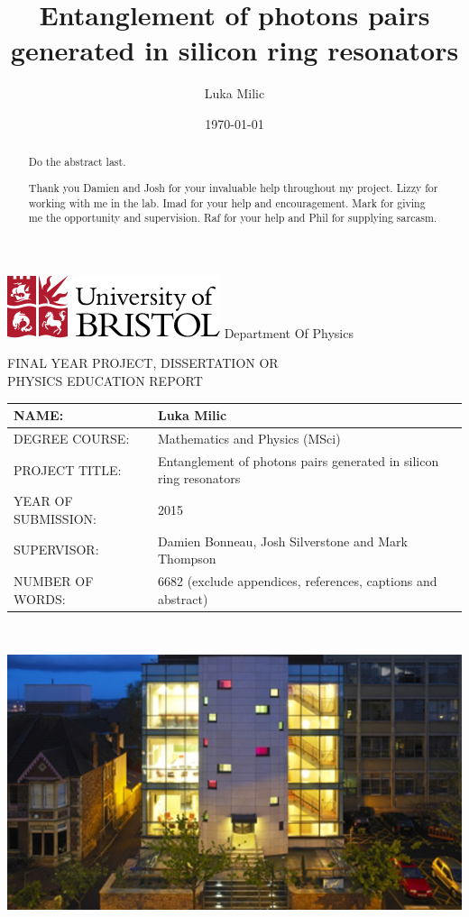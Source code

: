 \documentclass[11pt]{article}
\title{Entanglement of photons pairs generated in silicon ring resonators}
\date{\today}
\author{Luka Milic}
\numberwithin{equation}{section}
\numberwithin{figure}{section}
\begin{document}
\begin{titlepage}
  \includegraphics[scale=0.6]{img/uob-logo.png}\hfill
  \LARGE Department Of Physics \\
  \begin{center}
    FINAL YEAR PROJECT, DISSERTATION OR\\
    PHYSICS EDUCATION REPORT
  \end{center} 

  \large
  {\renewcommand{\arraystretch}{2}%
  \begin{tabular}[t]{|l|p{10cm}|}
    \hline
    NAME: & Luka Milic \\ \hline
    DEGREE COURSE: & Mathematics and Physics (MSci)\\ \hline
    PROJECT TITLE: & Entanglement of photons pairs generated in silicon ring resonators \\ \hline
    YEAR OF SUBMISSION: & 2015\\ \hline
    SUPERVISOR: & Damien Bonneau, Josh Silverstone and Mark Thompson\\ \hline
    NUMBER OF WORDS: & 6682 (exclude appendices, references, captions and abstract)\\ \hline
  \end{tabular} } \quad
  \\[1.5cm]
  \begin{center}
    \includegraphics[scale=0.7]{img/nsqi.jpg}
  \end{center}
\end{titlepage}
\newpage
\maketitle
\begin{abstract}
Do the abstract last.
\end{abstract}
\newpage
\renewcommand{\abstractname}{Acknowledgements}
\newpage
\begin{abstract}
Thank you Damien and Josh for your invaluable help throughout my project. Lizzy for working with me in the lab. Imad for your help and encouragement. Mark for giving me the opportunity and supervision. Raf for your help and  Phil for supplying sarcasm. 
\end{abstract}
\end{document}
